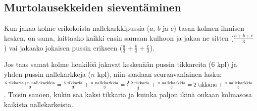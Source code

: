 

    \subsection{Murtolausekkeiden sieventäminen}


Kun jakaa kolme erikokoista nallekarkkipussia ($a$, $b$ ja $c$) tasan kolmen ihmisen kesken, on sama, laittaako kaikki ensin samaan kulhoon ja jakaa ne sitten ($\frac{a+b+c}{3}$) vai jakaako jokaisen pussin erikseen ($ \frac{a}{3} + \frac{b}{3} + \frac{c}{3}$).

Jos taas samat kolme henkilöä jakavat keskenään pussin tikkareita ($6$ kpl) ja yhden pussin nallekarkkeja ($n$ kpl), niin saadaan seuraavanlainen lasku: $ \frac{6\text{ tikkaria}+n\text{ nallekarkkia}}{3} = \frac{6\text{ tikkaria}}{3} + \frac{n\text{ nallekarkkia}}{3} = \frac{\cancel{3} \cdot 2\text{ tikkaria}}{\cancel{3}} + \frac{n\text{ nallekarkkia}}{3} = 2\text{ tikkaria} + \frac{n\text{ nallekarkkia}}{3}$. Toisin sanoen, kukin saa kaksi tikkaria ja kuinka paljon ikinä onkaan kolmasosa kaikista nallekarkeista.

